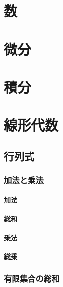 \documentclass[autodetect-engine,dvipdfmx-if-dvi,ja=standard,a4paper,12pt]{bxjsbook}
\begin{document}
	\tableofcontents
	\part{数}
	\part{微分}
	\part{積分}
	\part{線形代数}
     \chapter{行列式}
       \section{加法と乗法}
         \subsection{加法}
         \subsection{総和}
         \subsection{乗法}
         \subsection{総乗}
       \section{有限集合の総和}
\end{document}

